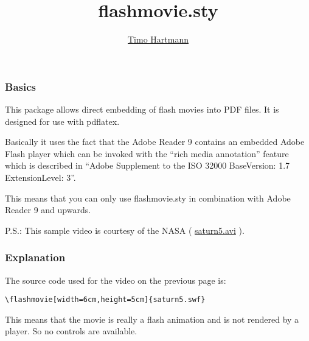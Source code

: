 \documentclass[10pt]{beamer}
\title[flashmovie.sty]{flashmovie.sty}
\author[\href{mailto:thartmann15@googlemail.com}{Timo Hartmann}]{\href{mailto:thartmann15@googlemail.com}{Timo Hartmann}}
\date[2010]{}
\begin{document}


\begin{frame}

\frametitle{Basics}

\begin{minipage}[t]{6.1cm}
\vspace{0cm}
\end{minipage}
\begin{minipage}[t]{5.7cm}
\vspace{0cm}
This package allows direct embedding of flash movies into PDF files. It is
designed for use with pdflatex.
\vspace{0.5cm}

Basically it uses the fact that the Adobe Reader 9 contains an embedded Adobe Flash 
player which can be invoked with the ``rich media annotation'' feature which is described 
in ``Adobe Supplement to the ISO 32000 BaseVersion: 1.7 ExtensionLevel: 3''.
\vspace{0.5cm}

This means that you can only use flashmovie.sty in combination
with Adobe Reader 9 and upwards.

\end{minipage}

\vspace{0.5cm}

P.S.: This sample video is courtesy of the NASA ( \href{http://heasarc.gsfc.nasa.gov/Videos/historical/saturn5.avi}{saturn5.avi} ).

\end{frame}


\begin{frame}[fragile]

\frametitle{Explanation}

The source code used for the video on the previous page is:

\begin{verbatim}
\flashmovie[width=6cm,height=5cm]{saturn5.swf}
\end{verbatim}

This means that the movie is really a flash animation and is not
rendered by a player. So no controls are available.

\end{frame}
\end{document}
